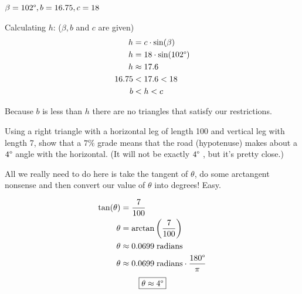 \begin{problem}[16.]
    $\beta = 102\degree, b = 16.75, c = 18$
\end{problem}

\begin{solution}
    Calculating $h$: ($\beta, b$ and $c$ are given)
    \begin{align}
        h &= c \cdot \sin(\beta) \\
        h &= 18 \cdot \sin(102\degree) \\
        h &\approx 17.6 \\
        16.75 &< 17.6 < 18 \\
        b &< h < c
    \end{align}
    
    Because $b$ is less than $h$ there are no triangles that satisfy our restrictions. 
\end{solution}


\begin{problem}[22]
    Using a right triangle with a horizontal leg of length 100 and vertical leg with length 7, show that a $7\%$ grade means that the road (hypotenuse) makes about a $4\degree$ angle with the horizontal. (It will not be exactly $4\degree$ , but it’s pretty close.)
\end{problem}

\begin{solution}
    
    All we really need to do here is take the tangent of $\theta$, do some arctangent nonsense and then convert our value of $\theta$ into degrees! Easy.
    
    \begin{align}
        \tan(\theta) &= \frac{7}{100} \\
        \theta &= \arctan \left( \frac{7}{100} \right) \\
        \theta &\approx 0.0699 \; \text{radians} \\
        \theta &\approx 0.0699 \; \text{radians} \cdot \frac{180\degree}{\pi} 
    \end{align}
    \[\boxed{\theta \approx 4\degree}\]
\end{solution}


